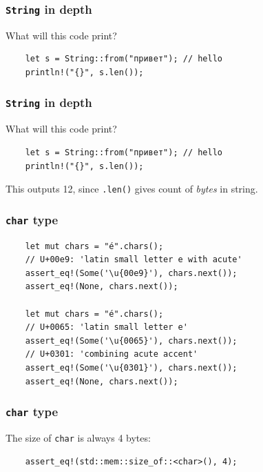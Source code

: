 \documentclass[aspectratio=1610,t]{beamer}
\begin{document}

\begin{frame}[fragile]
\frametitle{\texttt{String} in depth}
What will this code print?

\begin{verbatim}
    let s = String::from("привет"); // hello
    println!("{}", s.len());
\end{verbatim}
\end{frame}


\begin{frame}[fragile]
\frametitle{\texttt{String} in depth}
What will this code print?

\begin{verbatim}
    let s = String::from("привет"); // hello
    println!("{}", s.len());
\end{verbatim}

This outputs 12, since \texttt{.len()} gives count of \textit{bytes} in string.
\end{frame}



\begin{frame}[fragile]
\frametitle{\texttt{char} type}
\begin{verbatim}
    let mut chars = "é".chars();
    // U+00e9: 'latin small letter e with acute'
    assert_eq!(Some('\u{00e9}'), chars.next());
    assert_eq!(None, chars.next());

    let mut chars = "é".chars();
    // U+0065: 'latin small letter e'
    assert_eq!(Some('\u{0065}'), chars.next());
    // U+0301: 'combining acute accent'
    assert_eq!(Some('\u{0301}'), chars.next());
    assert_eq!(None, chars.next());
\end{verbatim}
\end{frame}


\begin{frame}[fragile]
\frametitle{\texttt{char} type}
The size of \texttt{char} is always 4 bytes:

\begin{verbatim}
    assert_eq!(std::mem::size_of::<char>(), 4);
\end{verbatim}
\end{frame}
\end{document}
